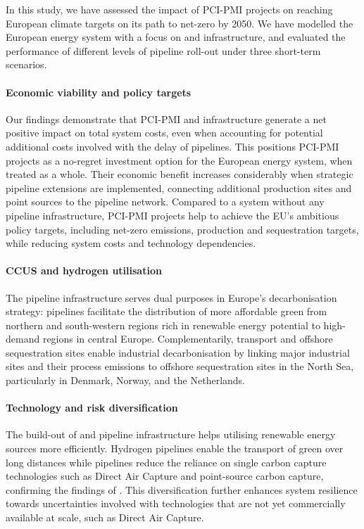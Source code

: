 \documentclass[final,5p,times,twocolumn,sort&compress]{elsarticle}
\begin{document}
In this study, we have assessed the impact of PCI-PMI projects on reaching European climate targets on its path to net-zero by 2050. We have modelled the European energy system with a focus on  and  infrastructure, and evaluated the performance of different levels of pipeline roll-out under three short-term scenarios. 


\paragraph{Economic viability and policy targets}
Our findings demonstrate that PCI-PMI  and  infrastructure generate a net positive impact on total system costs, even when accounting for potential additional costs involved with the delay of pipelines. This positions PCI-PMI projects as a no-regret investment option for the European energy system, when treated as a whole.
Their economic benefit increases considerably when strategic pipeline extensions are implemented, connecting additional  production sites and  point sources to the pipeline network. 
Compared to a system without any pipeline infrastructure, PCI-PMI projects help to achieve the EU's ambitious policy targets, including net-zero emissions,  production and  sequestration targets, while reducing system costs and technology dependencies.

\paragraph{CCUS and hydrogen utilisation}
The pipeline infrastructure serves dual purposes in Europe's decarbonisation strategy:  pipelines facilitate the distribution of more affordable green  from northern and south-western regions rich in renewable energy potential to high-demand regions in central Europe. Complementarily,  transport and offshore sequestration sites enable industrial decarbonisation by linking major industrial sites and their process emissions to offshore sequestration sites in the North Sea, particularly in Denmark, Norway, and the Netherlands.

\paragraph{Technology and risk diversification}
The build-out of  and  pipeline infrastructure helps utilising renewable energy sources more efficiently. Hydrogen pipelines enable the transport of green  over long distances while  pipelines reduce the reliance on single carbon capture technologies such as Direct Air Capture and point-source carbon capture, confirming the findings of \cite{hofmannH2CO2Network2025}. This diversification further enhances system resilience towards uncertainties involved with technologies that are not yet commercially available at scale, such as Direct Air Capture.
\end{document}
